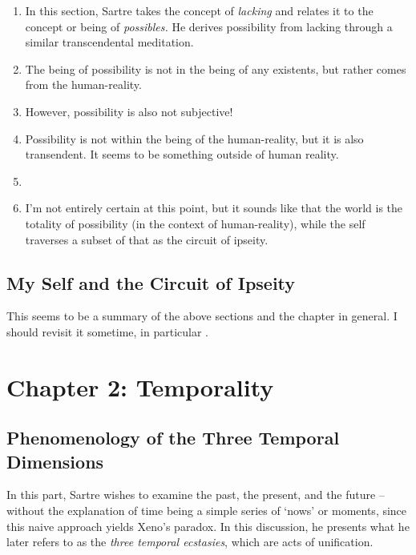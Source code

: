 \begin{enumerate}
  \item In this section, Sartre takes the concept of \emph{lacking} and relates it to the concept or being of \emph{possibles.} He derives possibility from lacking through a similar transcendental meditation.
  \item The being of possibility is not in the being of any existents, but rather comes from the human-reality.
  \item However, possibility is also not subjective!
  \item Possibility is not within the being of the human-reality, but it is also transendent. It seems to be something outside of human reality. \autocite[158]{sartre}
  \item {}
  \item I'm not entirely certain at this point, but it sounds like that the world is the totality of possibility (in the context of human-reality), while the self traverses a subset of that as the circuit of ipseity.
\end{enumerate}

\subsection{My Self and the Circuit of Ipseity}

This seems to be a summary of the above sections and the chapter in general. I should revisit it sometime, in particular \autocite[161]{sartre}.

\section{Chapter 2: Temporality}

\subsection{Phenomenology of the Three Temporal Dimensions}

In this part, Sartre wishes to examine the past, the present, and the future -- without the explanation of time being a simple series of `nows' or moments, since this naive approach yields Xeno's paradox. In this discussion, he presents what he later refers to as the \emph{three temporal ecstasies}, which are acts of unification. 

